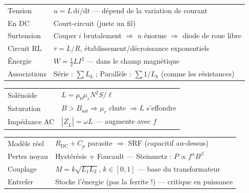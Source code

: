 \documentclass[12pt,a4paper,twoside]{book}
\begin{document}
\begin{bases}[title={\color{white} Résumé --- Les Bases}]
\begin{center}
\renewcommand{\arraystretch}{1.3}
\begin{tabular}{p{4cm}p{9cm}}
\toprule
Tension & $u = L\,\mathrm{d}i/\mathrm{d}t$ --- dépend de la variation de courant \\
En DC & Court-circuit (juste un fil) \\
Surtension & Couper $i$ brutalement $\Rightarrow$ $u$ énorme $\Rightarrow$ diode de roue libre \\
Circuit RL & $\tau = L/R$, établissement/décroissance exponentiels \\
Énergie & $W = \frac{1}{2}LI^2$ --- dans le champ magnétique \\
Associations & Série : $\sum L_k$ ; Parallèle : $\sum 1/L_k$ (comme les résistances) \\
\bottomrule
\end{tabular}
\end{center}
\end{bases}

\begin{approfondissement}[title={\color{white} Résumé --- Approfondissement}]
\begin{center}
\renewcommand{\arraystretch}{1.3}
\begin{tabular}{p{4cm}p{9cm}}
\toprule
Solénoïde & $L = \mu_0\mu_r N^2 S/\ell$ \\
Saturation & $B > B_{\text{sat}} \Rightarrow \mu_r$ chute $\Rightarrow L$ s'effondre \\
Impédance AC & $|\underline{Z}_L| = \omega L$ --- augmente avec $f$ \\
\bottomrule
\end{tabular}
\end{center}
\end{approfondissement}

\begin{ingenieur}[title={\color{white} Résumé --- Niveau Ingénieur}]
\begin{center}
\renewcommand{\arraystretch}{1.3}
\begin{tabular}{p{4cm}p{9cm}}
\toprule
Modèle réel & $R_{\text{DC}} + C_p$ parasite $\Rightarrow$ SRF (capacitif au-dessus) \\
Pertes noyau & Hystérésis + Foucault --- Steinmetz : $P \propto f^\alpha B^\beta$ \\
Couplage & $M = k\sqrt{L_1L_2}$, $k \in [0,1]$ --- base du transformateur \\
Entrefer & Stocke l'énergie (pas la ferrite !) --- critique en puissance \\
\bottomrule
\end{tabular}
\end{center}
\end{ingenieur}
\end{document}
